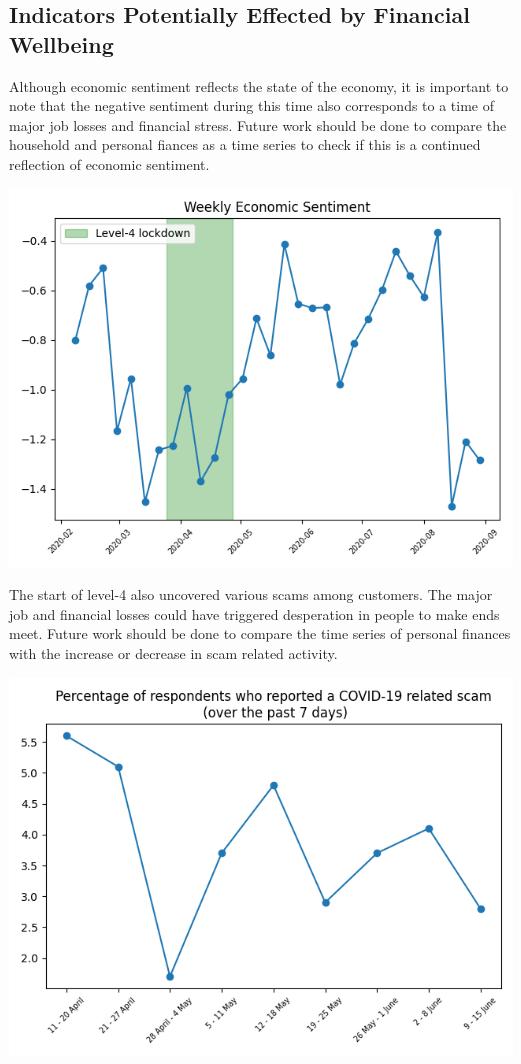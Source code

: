\documentclass{article}
\begin{document}
\vspace{5cm}
\subsection*{Indicators Potentially Effected by Financial Wellbeing}

Although economic sentiment reflects the state of the economy, it is important to note that the negative sentiment during this time also corresponds to a time of major job losses and financial stress. Future work should be done to compare the household and personal fiances as a time series to check if this is a continued reflection of economic sentiment. 

\begin{center}
\includegraphics[scale=0.5]{plots/econ.png}
\end{center}

The start of level-4 also uncovered various scams among customers. The major job and financial losses could have triggered desperation in people to make ends meet. Future work should be done to compare the time series of personal finances with the increase or decrease in scam related activity. 

\begin{center}
\includegraphics[scale=0.5]{plots/scam.png}
\end{center}
\end{document}

